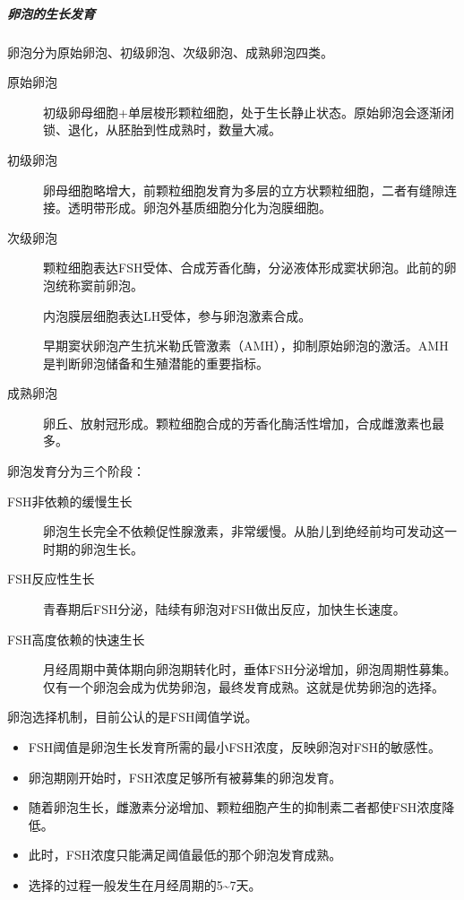 \subparagraph{卵泡的生长发育}

卵泡分为原始卵泡、初级卵泡、次级卵泡、成熟卵泡四类。

\begin{description}
	\item[原始卵泡] 初级卵母细胞+单层梭形颗粒细胞，处于生长静止状态。原始卵泡会逐渐闭锁、退化，从胚胎到性成熟时，数量大减。
	\item[初级卵泡] 卵母细胞略增大，前颗粒细胞发育为多层的立方状颗粒细胞，二者有缝隙连接。透明带形成。卵泡外基质细胞分化为泡膜细胞。
	\item[次级卵泡] 颗粒细胞表达FSH受体、合成芳香化酶，分泌液体形成窦状卵泡。此前的卵泡统称窦前卵泡。

	\hspace{2em} 内泡膜层细胞表达LH受体，参与卵泡激素合成。

	\hspace{2em} 早期窦状卵泡产生抗米勒氏管激素（AMH），抑制原始卵泡的激活。AMH是判断卵泡储备和生殖潜能的重要指标。
	\item[成熟卵泡] 卵丘、放射冠形成。颗粒细胞合成的芳香化酶活性增加，合成雌激素也最多。
\end{description}

卵泡发育分为三个阶段：

\begin{description}
	\item[FSH非依赖的缓慢生长] 卵泡生长完全不依赖促性腺激素，非常缓慢。从胎儿到绝经前均可发动这一时期的卵泡生长。
	\item[FSH反应性生长] 青春期后FSH分泌，陆续有卵泡对FSH做出反应，加快生长速度。
	\item[FSH高度依赖的快速生长] 月经周期中黄体期向卵泡期转化时，垂体FSH分泌增加，卵泡周期性募集。仅有一个卵泡会成为优势卵泡，最终发育成熟。这就是优势卵泡的选择。
\end{description}

卵泡选择机制，目前公认的是FSH阈值学说。

\begin{itemize}
	\item FSH阈值是卵泡生长发育所需的最小FSH浓度，反映卵泡对FSH的敏感性。
	\item 卵泡期刚开始时，FSH浓度足够所有被募集的卵泡发育。
	\item 随着卵泡生长，雌激素分泌增加、颗粒细胞产生的抑制素二者都使FSH浓度降低。
	\item 此时，FSH浓度只能满足阈值最低的那个卵泡发育成熟。
	\item 选择的过程一般发生在月经周期的5\textasciitilde7天。
\end{itemize}

